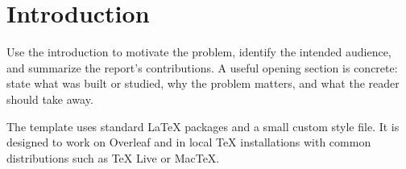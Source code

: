 \section{Introduction}

Use the introduction to motivate the problem, identify the intended audience,
and summarize the report's contributions. A useful opening section is concrete:
state what was built or studied, why the problem matters, and what the reader
should take away.

The template uses standard LaTeX packages and a small custom style file. It is
designed to work on Overleaf and in local TeX installations with common
distributions such as TeX Live or MacTeX.
